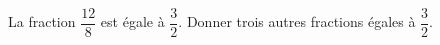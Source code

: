 
\begin{exercice}\label{exo2smath-0023}

    La fraction \( \dfrac{ 12 }{ 8 }\) est égale à \( \dfrac{ 3 }{ 2 }\). Donner trois autres fractions égales à \( \dfrac{ 3 }{ 2 }\).

\end{exercice}
